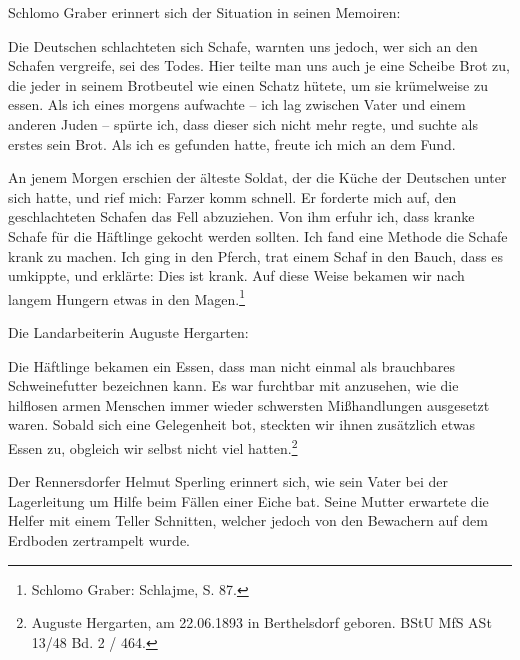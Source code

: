 Schlomo Graber erinnert sich der Situation in seinen Memoiren:
\begin{leftbar} 
Die Deutschen schlachteten sich Schafe, warnten uns jedoch, wer sich an den Schafen vergreife, sei des Todes. Hier teilte man uns auch je eine Scheibe Brot zu, die jeder in seinem Brotbeutel wie einen Schatz hütete, um sie krümelweise zu essen. Als ich eines morgens aufwachte -- ich lag zwischen Vater und einem anderen Juden -- spürte ich, dass dieser sich nicht mehr regte, und suchte als erstes sein Brot. Als ich es gefunden hatte, freute ich mich an dem Fund.

An jenem Morgen erschien der älteste Soldat, der die Küche der Deutschen unter sich hatte, und rief mich: \glqq Farzer komm schnell\grqq. Er forderte mich auf, den geschlachteten Schafen das Fell abzuziehen. Von ihm erfuhr ich, dass kranke Schafe für die Häftlinge gekocht werden sollten. Ich fand eine Methode die Schafe krank zu machen. Ich ging in den Pferch, trat einem Schaf in den Bauch, dass es umkippte, und erklärte: \glqq Dies ist krank\grqq. Auf diese Weise bekamen wir nach langem Hungern etwas in den Magen.\footnote{Schlomo Graber: Schlajme, S. 87.}
\end{leftbar}
Die Landarbeiterin Auguste Hergarten: 
\begin{leftbar} 
Die Häftlinge bekamen ein Essen, dass man nicht einmal als brauchbares Schweinefutter bezeichnen kann. Es war furchtbar mit anzusehen, wie die hilflosen armen Menschen immer wieder schwersten Mißhandlungen ausgesetzt waren. Sobald sich eine Gelegenheit bot, steckten wir ihnen zusätzlich etwas Essen zu, obgleich wir selbst nicht viel hatten.\footnote{Auguste Hergarten, am 22.06.1893 in Berthelsdorf geboren. BStU MfS ASt 13/48 Bd. 2 / 464.}
\end{leftbar}


Der Rennersdorfer Helmut Sperling erinnert sich, wie sein Vater bei der Lagerleitung um Hilfe beim Fällen einer Eiche bat. Seine Mutter erwartete die Helfer mit einem Teller Schnitten, welcher jedoch von den Bewachern auf dem Erdboden zertrampelt wurde.


